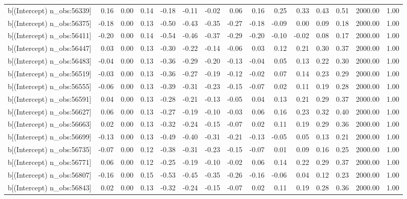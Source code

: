 \begin{table}[ht]
\begin{tabular}{rrrrrrrrrrrrrrr}
  b[(Intercept) n\_obs:56339] & 0.16 & 0.00 & 0.14 & -0.18 & -0.11 & -0.02 & 0.06 & 0.16 & 0.25 & 0.33 & 0.43 & 0.51 & 2000.00 & 1.00 \\ 
  b[(Intercept) n\_obs:56375] & -0.18 & 0.00 & 0.13 & -0.50 & -0.43 & -0.35 & -0.27 & -0.18 & -0.09 & 0.00 & 0.09 & 0.18 & 2000.00 & 1.00 \\ 
  b[(Intercept) n\_obs:56411] & -0.20 & 0.00 & 0.14 & -0.54 & -0.46 & -0.37 & -0.29 & -0.20 & -0.10 & -0.02 & 0.08 & 0.17 & 2000.00 & 1.00 \\ 
  b[(Intercept) n\_obs:56447] & 0.03 & 0.00 & 0.13 & -0.30 & -0.22 & -0.14 & -0.06 & 0.03 & 0.12 & 0.21 & 0.30 & 0.37 & 2000.00 & 1.00 \\ 
  b[(Intercept) n\_obs:56483] & -0.04 & 0.00 & 0.13 & -0.36 & -0.29 & -0.20 & -0.13 & -0.04 & 0.05 & 0.13 & 0.22 & 0.30 & 2000.00 & 1.00 \\ 
  b[(Intercept) n\_obs:56519] & -0.03 & 0.00 & 0.13 & -0.36 & -0.27 & -0.19 & -0.12 & -0.02 & 0.07 & 0.14 & 0.23 & 0.29 & 2000.00 & 1.00 \\ 
  b[(Intercept) n\_obs:56555] & -0.06 & 0.00 & 0.13 & -0.39 & -0.31 & -0.23 & -0.15 & -0.07 & 0.02 & 0.11 & 0.19 & 0.28 & 2000.00 & 1.00 \\ 
  b[(Intercept) n\_obs:56591] & 0.04 & 0.00 & 0.13 & -0.28 & -0.21 & -0.13 & -0.05 & 0.04 & 0.13 & 0.21 & 0.29 & 0.37 & 2000.00 & 1.00 \\ 
  b[(Intercept) n\_obs:56627] & 0.06 & 0.00 & 0.13 & -0.27 & -0.19 & -0.10 & -0.03 & 0.06 & 0.16 & 0.23 & 0.32 & 0.40 & 2000.00 & 1.00 \\ 
  b[(Intercept) n\_obs:56663] & 0.02 & 0.00 & 0.13 & -0.32 & -0.24 & -0.15 & -0.07 & 0.02 & 0.11 & 0.19 & 0.29 & 0.36 & 2000.00 & 1.00 \\ 
  b[(Intercept) n\_obs:56699] & -0.13 & 0.00 & 0.13 & -0.49 & -0.40 & -0.31 & -0.21 & -0.13 & -0.05 & 0.05 & 0.13 & 0.21 & 2000.00 & 1.00 \\ 
  b[(Intercept) n\_obs:56735] & -0.07 & 0.00 & 0.12 & -0.38 & -0.31 & -0.23 & -0.15 & -0.07 & 0.01 & 0.09 & 0.16 & 0.25 & 2000.00 & 1.00 \\ 
  b[(Intercept) n\_obs:56771] & 0.06 & 0.00 & 0.12 & -0.25 & -0.19 & -0.10 & -0.02 & 0.06 & 0.14 & 0.22 & 0.29 & 0.37 & 2000.00 & 1.00 \\ 
  b[(Intercept) n\_obs:56807] & -0.16 & 0.00 & 0.15 & -0.53 & -0.45 & -0.35 & -0.26 & -0.16 & -0.06 & 0.04 & 0.12 & 0.23 & 2000.00 & 1.00 \\ 
  b[(Intercept) n\_obs:56843] & 0.02 & 0.00 & 0.13 & -0.32 & -0.24 & -0.15 & -0.07 & 0.02 & 0.11 & 0.19 & 0.28 & 0.36 & 2000.00 & 1.00 \\ 

\end{tabular}
\end{table}
